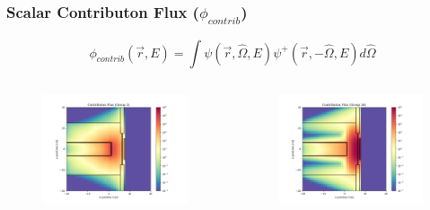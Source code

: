 \documentclass[t]{beamer}
\begin{document}
\begin{frame}
  \frametitle{Scalar Contributon Flux ($\phi_{contrib}$)}
  \vskip-0.25in
  \begin{equation}
    \phi_{contrib}\left(\vec{r},E\right) = \int\psi\left(\vec{r},\hat{\Omega},E\right)\psi^+\left(\vec{r},-\hat{\Omega},E\right)d\hat{\Omega}
  \end{equation}
  \vskip-0.25in
  \begin{columns}
    \begin{figure}
      \includegraphics[trim={0.7in 0.15in 1.05in 0.4in},clip,scale=0.36]{images/scalar_flux_con_g02.png}
    \end{figure}
    \begin{figure}
      \includegraphics[trim={0.7in 0.15in 1.05in 0.4in},clip,scale=0.36]{images/scalar_flux_con_g26.png}

\end{figure}
\end{columns}
\end{frame}
\end{document}
